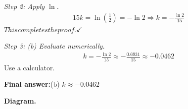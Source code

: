 \documentclass[11pt]{article}
\begin{document}
\textit{Step 2: Apply \( \ln \).}
\[\begin{gathered}
15k = \ln\!\left(\frac{1}{2}\right) = -\ln 2 \Rightarrow k = -\frac{\ln 2}{15}
\end{gathered}\]
\(\displaystyle This completes the proof. \checkmark\)

\textit{Step 3: (b) Evaluate numerically.}
\[\begin{gathered}
k = -\frac{\ln 2}{15} \approx -\frac{0.6931}{15} \approx -0.0462
\end{gathered}\]
Use a calculator.

\begin{answerbox}
\textbf{Final answer:}\quad (b) \(\displaystyle  k \approx -0.0462 \)
\end{answerbox}
\textbf{Diagram.}

\begin{center}
\end{center}
\end{document}
